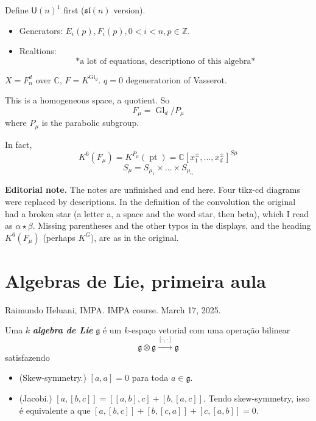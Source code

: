 \medskip{}
Define $\mathsf{U}(n)^1$ first
($\mathfrak{sl}(n)$ version).

\begin{itemize}
\item Generators: $E_i(p),F_i(p),
0<i<n,p\in\mathbb{Z}$.
\item Realtions:
$$\text{*a lot of equations, descriptiono of
this algebra*}$$
\end{itemize}

\medskip{}
$X=F_n^d$ over $\mathbb{C}$,
$F=K^{\operatorname{Gl}_d}$. $q=0$
degeneratorion of Vasserot.

\medskip{}
This is a homogeneous space, a quotient. So
$$F_\mu=\operatorname{Gl}_d/P_\mu$$
where $P_\mu$ is the parabolic subgroup.

In fact,
$$K^6(F_\mu)=K^{P_\mu}(\operatorname{pt})=
\mathbb{C}[x_1^\pm
,\ldots,x_d^\pm]^{S\mu}$$
$$S_\mu=S_{\mu_1}\times \ldots \times
S_{\mu_n}$$

\medskip\noindent
{\bf Editorial note.}
The notes are unfinished and end here.
Four tikz-cd diagrams were replaced by
descriptions. In the definition of the
convolution the original had a broken
star (a letter a, a space and the word
star, then beta), which I read as
$\alpha\star\beta$. Missing parentheses and
the other typos in the displays, and the
heading $K^6(F_\mu)$ (perhaps $K^G$), are as
in the original.

\section{Algebras de Lie, primeira aula}
\label{section-heluani-lie-algebras}

\noindent
Raimundo Heluani, IMPA.
IMPA course.
March 17, 2025.

\bigskip\noindent
\begin{definition}
\label{definition-heluani-lie-algebra}
Uma $k$ {\it\bf algebra de Lie}
$\mathfrak{g}$ é um $k$-espaço vetorial com
uma operação bilinear
$$\mathfrak{g} \otimes \mathfrak{g}
\xrightarrow{[\cdot ,\cdot ]}\mathfrak{g}$$
satisfazendo
\begin{itemize}
\item (Skew-symmetry.) $[a,a]=0$ para toda $a
\in \mathfrak{g}$.
\item (Jacobi.)
$[a,[b,c]]=[[a,b],c]+[b,[a,c]]$. Tendo
skew-symmetry, isso  é equivalente a que
$[a,[b,c]]+[b,[c,a]]+[c,[a,b]]=0$.
\end{itemize}
\end{definition}

